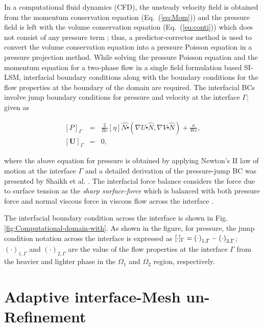 \documentclass[preprint,12pt]{elsarticle}
\begin{document}
In a computational fluid dynamics (CFD), the unsteady velocity field
is obtained from the momentum conservation equation (Eq.~(\ref{eq:Mom}))
and the pressure field is left with the volume conservation equation
(Eq.~(\ref{eq:conti})) which does not consist of any pressure term
\cite{Sharma2017}; thus, a predictor-corrector method is used to convert
the volume conservation equation into a pressure Poisson equation
in a pressure projection method. While solving the pressure Poisson
equation and the momentum equation for a two-phase flow in a single
field formulation based SI-LSM, interfacial boundary conditions along
with the boundary conditions for the flow properties at the boundary
of the domain are required. The interfacial BCs involve jump boundary
conditions for pressure and velocity at the interface $\Gamma$; given
as

\begin{eqnarray}
\left[P\right]_{\Gamma} & = & \frac{2}{Re}\left[\eta\right]\hat{N\centerdot}\left(\nabla U\centerdot\hat{N},\nabla V\centerdot\hat{N}\right)+\frac{\kappa}{We},\label{eq:Jump_P_Phase-1}\\
{}[\mathbf{U}]_{\Gamma} & = & 0,\nonumber
\end{eqnarray}


\noindent where the above equation for pressure is obtained by applying
Newton's II law of motion at the interface $\Gamma$ and a detailed
derivation of the pressure-jump BC was presented by Shaikh et al.
\cite{shaikh2018}. The interfacial force balance considers the force
due to surface tension as the \emph{sharp surface-force} which is
balanced with both pressure force and normal viscous force in viscous
flow across the interface\textcolor{blue}{{} }\textcolor{black}{\cite{francois2006}}.

The interfacial boundary condition across the interface
is shown in Fig. \ref{fig:Computational-domain-with}. As shown in
the figure, for pressure, the jump condition notation across the interface
is expressed as\textcolor{black}{{} ${\color{black}{\color{red}{\color{black}[\cdot]_{\Gamma}=\left(\cdot\right)_{1,\Gamma}-\left(\cdot\right)_{2,\Gamma}}}}$};
$\left(\cdot\right)_{1,\Gamma}$ and $\left(\cdot\right)_{2,\Gamma}$
are the value of the flow properties at the interface $\Gamma$ from
the heavier and lighter phase in the $\Omega_{1}$ and $\Omega_{2}$
region, respectively.

\section{Adaptive interface-Mesh un-Refinement}\label{sec:Concept-of-Semi-Adaptive}
\end{document}
